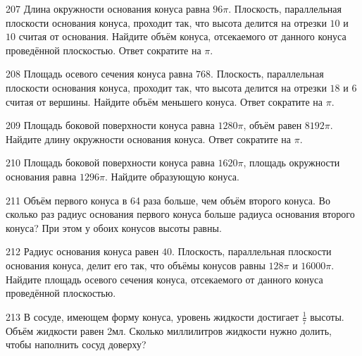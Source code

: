 \documentclass[a4paper]{article}
\begin{document}
\begin{taskBN}{207}
Длина окружности основания конуса равна $96\pi$. Плоскость, параллельная плоскости основания конуса,  проходит так, что высота делится на отрезки $10$ и $10$ считая от основания. Найдите объём конуса, отсекаемого от данного конуса проведённой плоскостью. Ответ сократите на $\pi$.
\end{taskBN}

\begin{taskBN}{208}
Площадь осевого сечения конуса равна $768$. Плоскость, параллельная плоскости основания конуса,  проходит так, что высота делится на отрезки $18$ и $6$ считая от вершины. Найдите объём меньшего конуса. Ответ сократите на $\pi$.
\end{taskBN}

\begin{taskBN}{209}
Площадь боковой поверхности конуса равна $1280\pi$, объём равен $8192\pi$. Найдите длину окружности основания конуса. Ответ сократите на $\pi$.
\end{taskBN}

\begin{taskBN}{210}
Площадь боковой поверхности конуса равна $1620\pi$, площадь окружности основания равна $1296\pi$. Найдите образующую конуса. 
\end{taskBN}

\begin{taskBN}{211}
Объём первого конуса в 64 раза больше, чем объём второго конуса. Во сколько раз радиус основания первого конуса больше радиуса основания второго конуса? При этом у обоих конусов высоты равны.
\end{taskBN}

\begin{taskBN}{212}
Радиус основания конуса равен $40$. Плоскость, параллельная плоскости основания конуса,  делит его так, что объёмы конусов равны $128\pi$ и $16000\pi$. Найдите площадь осевого сечения конуса, отсекаемого от данного конуса проведённой плоскостью. 
\end{taskBN}

\begin{taskBN}{213}
В сосуде, имеющем форму конуса, уровень жидкости достигает $\frac{1}{7}$ высоты. Объём жидкости равен 2мл. Сколько миллилитров жидкости нужно долить, чтобы наполнить сосуд доверху?
\end{taskBN}
\end{document}

